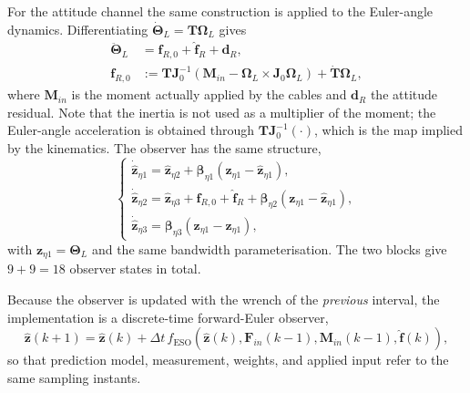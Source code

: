 \documentclass[Review,sageh,times]{sagej}
\begin{document}
For the attitude channel the same construction is applied to the Euler-angle
dynamics. Differentiating $\dot{\boldsymbol{\Theta}}_L=\mathbf{T}\boldsymbol{\Omega}_L$ gives
\begin{equation}
\begin{aligned}
\ddot{\boldsymbol{\Theta}}_L &= \mathbf{f}_{R,0} + \hat{\mathbf{f}}_R + \mathbf{d}_R,\\
\mathbf{f}_{R,0} &:= \mathbf{T}\mathbf{J}_0^{-1}\left(\mathbf{M}_{in}
- \boldsymbol{\Omega}_L\times\mathbf{J}_0\boldsymbol{\Omega}_L\right)
+ \dot{\mathbf{T}}\boldsymbol{\Omega}_L,
\end{aligned}
\label{eq:attacc}
\end{equation}
where $\mathbf{M}_{in}$ is the moment actually applied by the cables and
$\mathbf{d}_R$ the attitude residual. Note that the inertia is not used as a
multiplier of the moment; the Euler-angle acceleration is obtained through
$\mathbf{T}\mathbf{J}_0^{-1}(\cdot)$, which is the map implied by the kinematics. The
observer has the same structure,
\begin{equation}
\begin{cases}
\dot{\hat{\mathbf{z}}}_{\eta1} = \hat{\mathbf{z}}_{\eta2} + \boldsymbol{\beta}_{\eta1}\left(\mathbf{z}_{\eta1}-\hat{\mathbf{z}}_{\eta1}\right),\\[1mm]
\dot{\hat{\mathbf{z}}}_{\eta2} = \hat{\mathbf{z}}_{\eta3} + \mathbf{f}_{R,0} + \hat{\mathbf{f}}_R
+ \boldsymbol{\beta}_{\eta2}\left(\mathbf{z}_{\eta1}-\hat{\mathbf{z}}_{\eta1}\right),\\[1mm]
\dot{\hat{\mathbf{z}}}_{\eta3} = \boldsymbol{\beta}_{\eta3}\left(\mathbf{z}_{\eta1}-\hat{\mathbf{z}}_{\eta1}\right),
\end{cases}
\label{eq:esoatt}
\end{equation}
with $\mathbf{z}_{\eta1}=\boldsymbol{\Theta}_L$ and the same bandwidth
parameterisation. The two blocks give $9+9=18$ observer states in total.

Because the observer is updated with the wrench of the \emph{previous}
interval, the implementation is a discrete-time forward-Euler observer,
\begin{equation}
\hat{\mathbf{z}}(k+1) = \hat{\mathbf{z}}(k) + \Delta t\,
f_{\mathrm{ESO}}\left(\hat{\mathbf{z}}(k),\mathbf{F}_{in}(k-1),\mathbf{M}_{in}(k-1),
\hat{\mathbf{f}}(k)\right),
\label{eq:esodiscrete}
\end{equation}
so that prediction model, measurement, weights, and applied input refer to
the same sampling instants.
\end{document}
